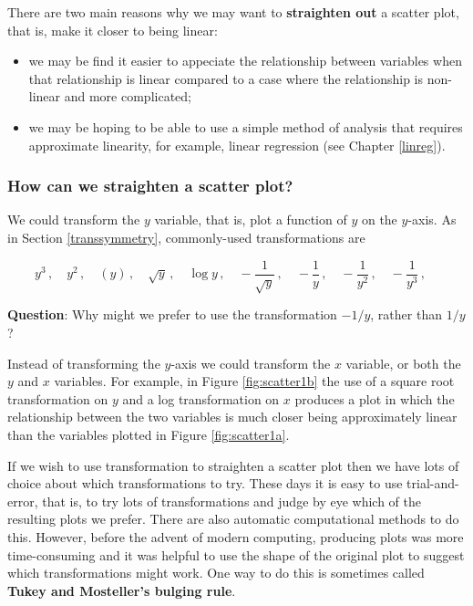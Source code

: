 \documentclass[
  british,
  11pt,
  openany, a4paper]{book}
\providecommand{\tightlist}{%
  \setlength{\itemsep}{0pt}\setlength{\parskip}{0pt}}
\begin{document}
There are two main reasons why we may want to \textbf{straighten out} a scatter plot, that is, make it closer to being linear:

\begin{itemize}
\tightlist
\item
  we may be find it easier to appeciate the relationship between variables when that relationship is linear compared to a case where the relationship is non-linear and more complicated;
\item
  we may be hoping to be able to use a simple method of analysis that requires approximate linearity, for example, linear regression (see Chapter \ref{linreg}).
\end{itemize}

\subsubsection*{How can we straighten a scatter plot?}\label{how-can-we-straighten-a-scatter-plot}

We could transform the \(y\) variable, that is, plot a function of \(y\) on the \(y\)-axis. As in Section \ref{transsymmetry}, commonly-used transformations are

\[
y^3\,, \quad
y^2\,, \quad
(y)\,, \quad 
\sqrt{y}\,, \quad
\log y\,, \quad
-\frac{1}{\sqrt{y}}\,, \quad
-\frac1y\,, \quad
-\frac{1}{y^2}\,, \quad
-\frac{1}{y^3}\,, \quad 
\]

\textbf{Question}: Why might we prefer to use the transformation \(-1/y\), rather than \(1/y\)?

Instead of transforming the \(y\)-axis we could transform the \(x\) variable, or both the \(y\) and \(x\) variables. For example, in Figure \ref{fig:scatter1b} the use of a square root transformation on \(y\) and a log transformation on \(x\) produces a plot in which the relationship between the two variables is much closer being approximately linear than the variables plotted in Figure \ref{fig:scatter1a}.

If we wish to use transformation to straighten a scatter plot then we have lots of choice about which transformations to try. These days it is easy to use trial-and-error, that is, to try lots of transformations and judge by eye which of the resulting plots we prefer. There are also automatic computational methods to do this. However, before the advent of modern computing, producing plots was more time-consuming and it was helpful to use the shape of the original plot to suggest which transformations might work. One way to do this is sometimes called \textbf{Tukey and Mosteller's bulging rule}.
\end{document}

